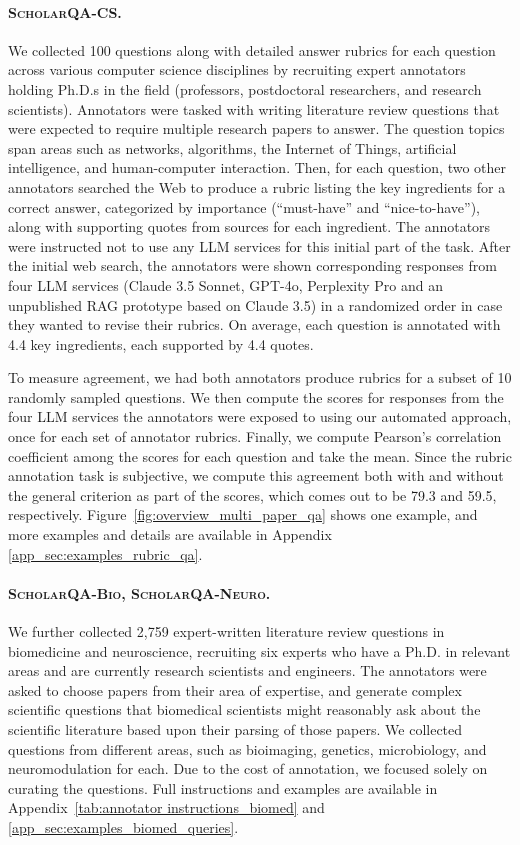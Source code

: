\paragraph{\textsc{ScholarQA-CS}.} 
We collected 100 questions along with detailed answer rubrics for each question across various computer science disciplines by recruiting expert annotators holding Ph.D.s in the field (professors, postdoctoral researchers, and research scientists). 
Annotators were tasked with writing literature review questions that were expected to require multiple research papers to answer. 
The question topics span areas such as networks, algorithms, the Internet of Things, artificial intelligence, and human-computer interaction. 
Then, for each question, two other annotators searched the Web to produce a rubric listing the key ingredients for a correct answer, categorized by importance (``must-have'' and ``nice-to-have''), along with supporting quotes from sources for each ingredient. {The annotators were instructed not to use any LLM services for this initial part of the task. After the initial web search, the annotators were shown corresponding responses from four LLM services {(Claude 3.5 Sonnet, GPT-4o, Perplexity Pro and an unpublished RAG prototype based on Claude 3.5)} in a randomized order in case they wanted to revise their rubrics.} On average, each question is annotated with 4.4 key ingredients, each supported by 4.4 quotes. 

{To measure agreement, we had both annotators produce rubrics for a subset of 10 randomly sampled questions. We then compute the scores for responses from the four LLM services the annotators were exposed to using our automated approach, once for each set of annotator rubrics. Finally, we compute Pearson's correlation coefficient among the scores for each question and take the mean. Since the rubric annotation task is subjective, we compute this agreement both with and without the general criterion as part of the scores, which comes out to be 79.3 and 59.5, respectively.}
Figure~\ref{fig:overview_multi_paper_qa} shows one example, and more examples and details are available in Appendix \ref{app_sec:examples_rubric_qa}. 

\paragraph{\textsc{ScholarQA-Bio}, \textsc{ScholarQA-Neuro}.}
We further collected 2,759 expert-written literature review questions in biomedicine and neuroscience, recruiting six experts who have a Ph.D. in relevant areas and are currently research scientists and engineers.  
{The annotators were asked to choose papers from their area of expertise,} and generate complex scientific questions that biomedical scientists might reasonably ask about the scientific literature {based upon their parsing of those papers}. We collected questions from different areas, such as bioimaging, genetics, microbiology, and neuromodulation for each.  
Due to the cost of annotation, we focused solely on curating the questions. 
Full instructions and examples are available in Appendix~\ref{tab:annotator instructions_biomed} and \ref{app_sec:examples_biomed_queries}. 


